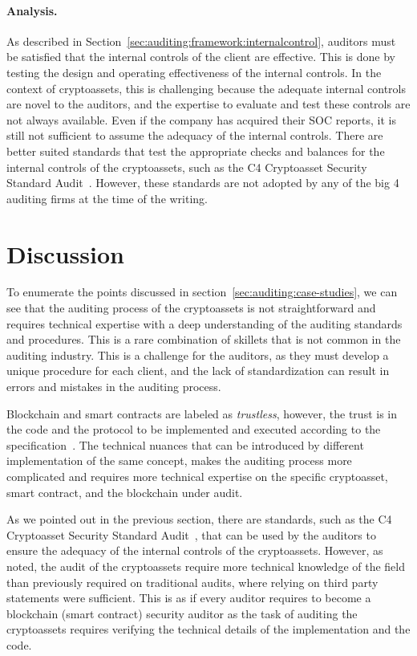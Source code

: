 \paragraph{Analysis.} As described in Section~\ref{sec:auditing:framework:internalcontrol}, auditors must be satisfied that the internal controls of the client are effective. This is done by testing the design and operating effectiveness of the internal controls. In the context of cryptoassets, this is challenging because the adequate internal controls are novel to the auditors, and the expertise to evaluate and test these controls are not always available. Even if the company has acquired their SOC reports, it is still not sufficient to assume the adequacy of the internal controls. There are better suited standards that test the appropriate checks and balances for the internal controls of the cryptoassets, such as the C4 Cryptoasset Security Standard Audit~\cite{c4ccssa}. However, these standards are not adopted by any of the big 4 auditing firms at the time of the writing. 


\section{Discussion} \label{sec:auditing:discussion}
To enumerate the points discussed in section~\ref{sec:auditing:case-studies}, we can see that the auditing process of the cryptoassets is not straightforward and requires technical expertise with a deep understanding of the auditing standards and procedures. This is a rare combination of skillets that is not common in the auditing industry. This is a challenge for the auditors, as they must develop a unique procedure for each client, and the lack of standardization can result in errors and mistakes in the auditing process.

Blockchain and smart contracts are labeled as \textit{trustless}, however, the trust is in the code and the protocol to be implemented and executed according to the specification~\cite{gaggioli2019middleman}. The technical nuances that can be introduced by different implementation of the same concept, makes the auditing process more complicated and requires more technical expertise on the specific cryptoasset, smart contract, and the blockchain under audit.

As we pointed out in the previous section, there are standards, such as the C4 Cryptoasset Security Standard Audit~\cite{c4ccssa}, that can be used by the auditors to ensure the adequacy of the internal controls of the cryptoassets. However, as noted, the audit of the cryptoassets require more technical knowledge of the field than previously required on traditional audits, where relying on third party statements were sufficient. This is as if every auditor requires to become a blockchain (smart contract) security auditor as the task of auditing the cryptoassets requires verifying the technical details of the implementation and the code.

